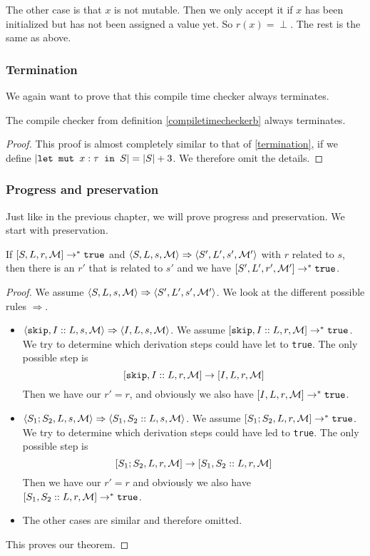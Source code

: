 The other case is that $x$ is not mutable. Then we only accept it if $x$ has been initialized but has not been assigned a value yet. So $r(x) = \perp$. The rest is the same as above. 

\subsubsection*{Termination}
We again want to prove that this compile time checker always terminates. 

\begin{theorem}
\label{terminationb}
The compile checker from definition \ref{compiletimecheckerb} always terminates.
\end{theorem}

\begin{proof}
This proof is almost completely similar to that of \ref{termination}, if we define $|\texttt{let mut }x : \tau \texttt{ in } S| = |S| + 3$. We therefore omit the details.
\end{proof}

\subsubsection*{Progress and preservation}
Just like in the previous chapter, we will prove progress and preservation. We start with preservation.

\begin{theorem}
\label{preservationb}
If $[ S, L, r, \mathcal{M} ] \to ^* \texttt{true}$ and $\langle S, L, s, \mathcal{M} \rangle \Rightarrow \langle S', L', s', \mathcal{M'} \rangle$ with $r$ related to $s$, then there is an $r'$ that is related to $s'$ and we have $[ S', L', r', \mathcal{M'} ] \to ^* \texttt{true}$.
\end{theorem}

\begin{proof}
We assume $\langle S, L, s, \mathcal{M} \rangle \Rightarrow \langle S', L', s', \mathcal{M'} \rangle$. We look at the different possible rules $\Rightarrow$. 
\begin{itemize}[noitemsep]
    \item $\langle \texttt{skip}, I::L, s, \mathcal{M} \rangle \Rightarrow \langle I, L, s, \mathcal{M} \rangle$. We assume $[ \texttt{skip}, I::L, r, \mathcal{M} ] \to ^* \texttt{true}$. We try to determine which derivation steps could have let to \texttt{true}. The only possible step is 
    $$[ \texttt{skip}, I::L, r, \mathcal{M} ]\to [ I, L, r, \mathcal{M} ]$$
    Then we have our $r' = r$, and obviously we also have $[ I, L, r, \mathcal{M} ] \to^* \texttt{true}$.
    \item $\langle S_1; S_2, L, s, \mathcal{M} \rangle \Rightarrow \langle S_1, S_2::L, s, \mathcal{M} \rangle$. We assume $[ S_1; S_2, L, r, \mathcal{M} ] \to ^* \texttt{true}$. We try to determine which derivation steps could have led to \texttt{true}. The only possible step is 
    $$[ S_1; S_2, L, r, \mathcal{M} ] \to [ S_1, S_2::L, r, \mathcal{M} ]$$
    Then we have our $r' = r$ and obviously we also have $[ S_1, S_2::L, r, \mathcal{M} ] \to^* \texttt{true}$.
    \item The other cases are similar and therefore omitted.
\end{itemize}
This proves our theorem.
\end{proof}


